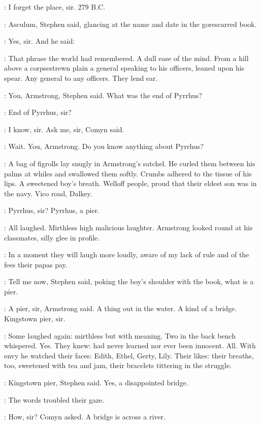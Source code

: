 \cochrane:
I forget the place, sir. 279 B.C.

\Stephen:
Asculum, Stephen said, glancing at the name and date in the gorescarred
book.

\cochrane:
Yes, sir. And he said: 


\StephenInt:
That phrase the world had remembered. A dull ease of the mind. From a
hill above a corpsestrewn plain a general speaking to his officers,
leaned upon his spear. Any general to any officers. They lend ear.

\Stephen:
You, Armstrong, Stephen said. What was the end of Pyrrhus?

\armstrong:
End of Pyrrhus, sir?

\comyn:
I know, sir. Ask me, sir, Comyn said.

\Stephen:
Wait. You, Armstrong. Do you know anything about Pyrrhus?

:
A bag of figrolls lay snugly in Armstrong's satchel. He curled them
between his palms at whiles and swallowed them softly. Crumbs adhered to
the tissue of his lips. A sweetened boy's breath. Welloff people, proud
that their eldest son was in the navy. Vico road, Dalkey.

\armstrong:
Pyrrhus, sir? Pyrrhus, a pier.

:
All laughed. Mirthless high malicious laughter. Armstrong looked round at
his classmates, silly glee in profile.

\StephenInt:
In a moment they will laugh more
loudly, aware of my lack of rule and of the fees their papas pay.

\Stephen:
Tell me now, Stephen said, poking the boy's shoulder with the book,
what is a pier.

\armstrong:
A pier, sir, Armstrong said. A thing out in the water. A kind of a
bridge. Kingstown pier, sir.


:
Some laughed again: mirthless but with meaning. Two in the back bench
whispered. Yes. They knew: had never learned nor ever been innocent. All.
With envy he watched their faces: Edith, Ethel, Gerty, Lily. Their likes:
their breaths, too, sweetened with tea and jam, their bracelets tittering
in the struggle.

\Stephen:
Kingstown pier, Stephen said. Yes, a disappointed bridge.


:
The words troubled their gaze.

\comyn:
How, sir? Comyn asked. A bridge is across a river.


